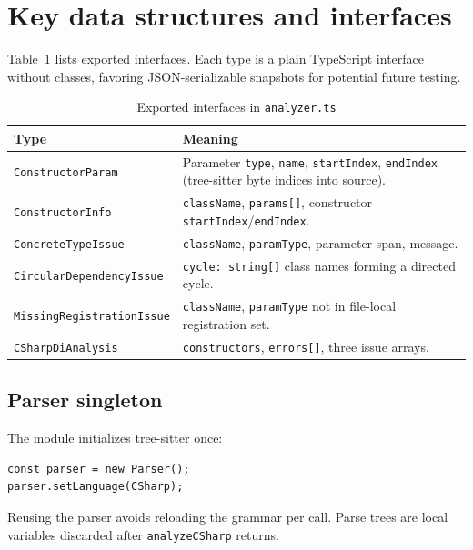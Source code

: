 \section{Key data structures and interfaces}
\label{chap3:data-structures}

Table~\ref{tab:analyzer-types} lists exported interfaces. Each type is a plain TypeScript interface without classes, favoring JSON-serializable snapshots for potential future testing.

\begin{table}[htbp]
\centering
\caption{Exported interfaces in \texttt{analyzer.ts}}
\label{tab:analyzer-types}
\begin{tabular}{|l|p{8.5cm}|}
\hline
\textbf{Type} & \textbf{Meaning} \\
\hline
\texttt{ConstructorParam} & Parameter \texttt{type}, \texttt{name}, \texttt{startIndex}, \texttt{endIndex} (tree-sitter byte indices into source). \\
\hline
\texttt{ConstructorInfo} & \texttt{className}, \texttt{params[]}, constructor \texttt{startIndex}/\texttt{endIndex}. \\
\hline
\texttt{ConcreteTypeIssue} & \texttt{className}, \texttt{paramType}, parameter span, message. \\
\hline
\texttt{CircularDependencyIssue} & \texttt{cycle: string[]} class names forming a directed cycle. \\
\hline
\texttt{MissingRegistrationIssue} & \texttt{className}, \texttt{paramType} not in file-local registration set. \\
\hline
\texttt{CSharpDiAnalysis} & \texttt{constructors}, \texttt{errors[]}, three issue arrays. \\
\hline
\end{tabular}
\end{table}

\subsection{Parser singleton}

The module initializes tree-sitter once:

\begin{lstlisting}[caption={Parser initialization (\texttt{analyzer.ts})}]
const parser = new Parser();
parser.setLanguage(CSharp);
\end{lstlisting}

Reusing the parser avoids reloading the grammar per call. Parse trees are local variables discarded after \texttt{analyzeCSharp} returns.

